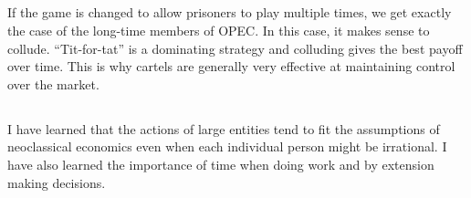 \documentclass{article}
\begin{document}
\subsection{}
If the game is changed to allow prisoners to play multiple times, we get exactly the case of the long-time members of OPEC. In this case, it makes sense to collude. “Tit-for-tat” is a dominating strategy and colluding gives the best payoff over time. This is why cartels are generally very effective at maintaining control over the market.

\subsection{}
I have learned that the actions of large entities tend to fit the assumptions of neoclassical economics even when each individual person might be irrational. I have also learned the importance of time when doing work and by extension making decisions.
\end{document}
